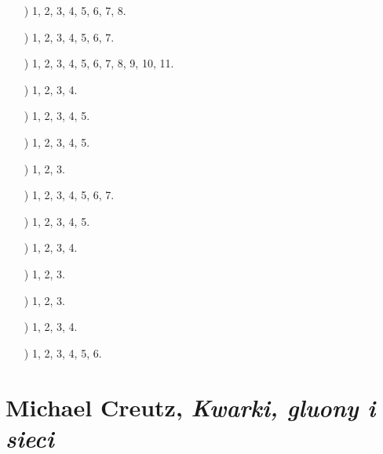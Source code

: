 \documentclass[a4paper,11pt]{article}
\numberwithin{equation}{section}
\begin{document}
\begin{itemize}

\item[\romannumeral1)] 1, 2, 3, 4, 5, 6, 7, 8.

\item[\romannumeral2)] 1, 2, 3, 4, 5, 6, 7.

\item[\romannumeral3)] 1, 2, 3, 4, 5, 6, 7, 8, 9, 10, 11.

\item[\romannumeral4)] 1, 2, 3, 4.

\item[\romannumeral5)] 1, 2, 3, 4, 5.

\item[\romannumeral6)] 1, 2, 3, 4, 5.

\item[\romannumeral7)] 1, 2, 3.

\item[\romannumeral8)] 1, 2, 3, 4, 5, 6, 7.

\item[\romannumeral9)] 1, 2, 3, 4, 5.

\item[\romannumeral10)] 1, 2, 3, 4.

\item[\romannumeral11)] 1, 2, 3.

\item[\romannumeral12)] 1, 2, 3.

\item[\romannumeral13)] 1, 2, 3, 4.

\item[\romannumeral14)] 1, 2, 3, 4, 5, 6.

\end{itemize}










\section{Michael Creutz, \textit{Kwarki, gluony i sieci}
}

\label{sec:Oznaczenia-i-konwencje}
\end{document}
